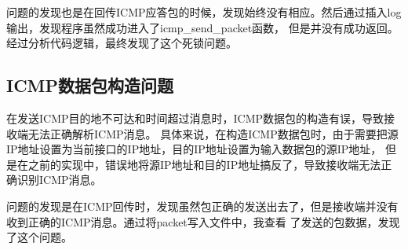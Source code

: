 \documentclass[11pt]{article}
\begin{document}
问题的发现也是在回传ICMP应答包的时候，发现始终没有相应。然后通过插入log输出，发现程序虽然成功进入了icmp\_send\_packet函数，
但是并没有成功返回。经过分析代码逻辑，最终发现了这个死锁问题。

\subsection{ICMP数据包构造问题}
在发送ICMP目的地不可达和时间超过消息时，ICMP数据包的构造有误，导致接收端无法正确解析ICMP消息。
具体来说，在构造ICMP数据包时，由于需要把源IP地址设置为当前接口的IP地址，目的IP地址设置为输入数据包的源IP地址，
但是在之前的实现中，错误地将源IP地址和目的IP地址搞反了，导致接收端无法正确识别ICMP消息。

问题的发现是在ICMP回传时，发现虽然包正确的发送出去了，但是接收端并没有收到正确的ICMP消息。通过将packet写入文件中，我查看
了发送的包数据，发现了这个问题。
\end{document}
